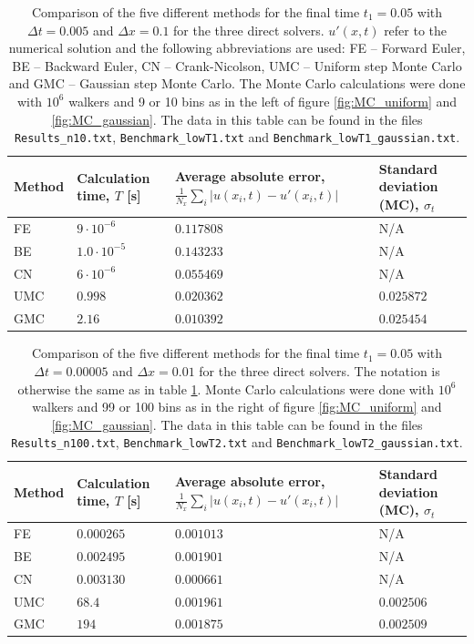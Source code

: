 \documentclass[a4paper, 11pt, notitlepage,english]{article}
\begin{document}
\begin{table}[h!tb]
\begin{center}
\begin{tabular}{p{2cm} p{2cm} p{4cm} p{2.5cm}}
\toprule
Method & Calculation time, $T$ [s] & Average absolute error, $\frac{1}{N_x}\sum_i\lvert u(x_i,t) - u'(x_i,t) \rvert$ & Standard deviation (MC), $\sigma_t$ \\ \midrule
FE & $9\cdot 10^{-6}$ & $0.117808$ & N/A \\
BE & $1.0\cdot 10^{-5}$ & $0.143233$ & N/A \\
CN & $6\cdot 10^{-6}$ & $0.055469$ & N/A \\
UMC & $0.998$ & $0.020362$ & $0.025872$ \\
GMC & $2.16$ & $0.010392$ & $0.025454$ \\
\bottomrule
\end{tabular}
\caption{Comparison of the five different methods for the final time $t_1 = 0.05$ with $\Delta t = 0.005$ and $\Delta x=0.1$ for the three direct solvers. $u'(x,t)$ refer to the numerical solution and the following abbreviations are used: FE – Forward Euler, BE – Backward Euler, CN – Crank-Nicolson, UMC – Uniform step Monte Carlo and GMC – Gaussian step Monte Carlo. The Monte Carlo calculations were done with $10^{6}$ walkers and 9 or 10 bins as in the left of figure \ref{fig:MC_uniform} and \ref{fig:MC_gaussian}. The data in this table can be found in the files \texttt{Results\_n10.txt}, \texttt{Benchmark\_lowT1.txt} and \texttt{Benchmark\_lowT1\_gaussian.txt}. } 
\label{tab:Benchmark1}
\end{center}
\end{table}

\begin{table}[h!tb]
\begin{center}
\begin{tabular}{p{2cm} p{2cm} p{4cm} p{2.5cm}}
\toprule
Method & Calculation time, $T$ [s] & Average absolute error, $\frac{1}{N_x}\sum_i\lvert u(x_i,t) - u'(x_i,t) \rvert$ & Standard deviation (MC), $\sigma_t$ \\ \midrule
FE & $0.000265$ & $0.001013$ & N/A \\
BE & $0.002495$ & $0.001901$ & N/A \\
CN & $0.003130$ & $0.000661$ & N/A \\
UMC & $68.4$ & $0.001961$ & $0.002506$ \\
GMC & $194$ & $0.001875$ & $0.002509$ \\
\bottomrule
\end{tabular}
\caption{Comparison of the five different methods for the final time $t_1 = 0.05$ with $\Delta t = 0.00005$ and $\Delta x=0.01$ for the three direct solvers. The notation is otherwise the same as in table \ref{tab:Benchmark1}. Monte Carlo calculations were done with $10^{6}$ walkers and 99 or 100 bins as in the right of figure \ref{fig:MC_uniform} and \ref{fig:MC_gaussian}. The data in this table can be found in the files \texttt{Results\_n100.txt}, \texttt{Benchmark\_lowT2.txt} and \texttt{Benchmark\_lowT2\_gaussian.txt}.} 
\label{tab:Benchmark2}
\end{center}
\end{table}
\end{document}

